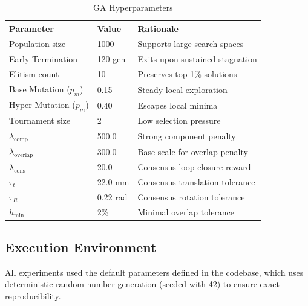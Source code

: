 \documentclass[conference]{IEEEtran}
\begin{document}
\begin{table}[htbp]
\caption{GA Hyperparameters}
\begin{center}
\begin{tabular}{|l|l|l|}
\hline
\textbf{Parameter} & \textbf{Value} & \textbf{Rationale} \\
\hline
Population size & 1000 & Supports large search spaces \\
Early Termination & 120 gen & Exits upon sustained stagnation \\
Elitism count & 10 & Preserves top 1\% solutions \\
Base Mutation ($p_m$) & 0.15 & Steady local exploration \\
Hyper-Mutation ($p_m$) & 0.40 & Escapes local minima \\
Tournament size & 2 & Low selection pressure \\
\hline
$\lambda_{\text{comp}}$ & 500.0 & Strong component penalty \\
$\lambda_{\text{overlap}}$ & 300.0 & Base scale for overlap penalty \\
$\lambda_{\text{cons}}$ & 20.0 & Consensus loop closure reward \\
$\tau_t$ & 22.0 mm & Consensus translation tolerance \\
$\tau_R$ & 0.22 rad & Consensus rotation tolerance \\
$h_{\min}$ & 2\% & Minimal overlap tolerance \\
\hline
\end{tabular}
\label{tab1}
\end{center}
\end{table}

\subsection{Execution Environment}
All experiments used the default parameters defined in the codebase, which uses deterministic random number generation (seeded with 42) to ensure exact reproducibility.
\end{document}
